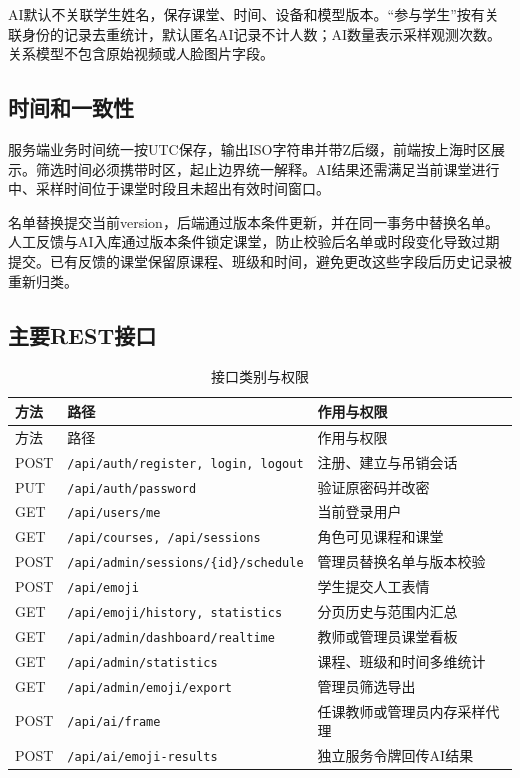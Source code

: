 \documentclass[UTF8,a4paper,zihao=-4,fontset=fandol]{ctexart}
\begin{document}
AI默认不关联学生姓名，保存课堂、时间、设备和模型版本。“参与学生”按有关联身份的记录去重统计，默认匿名AI记录不计人数；AI数量表示采样观测次数。关系模型不包含原始视频或人脸图片字段。

\subsection{时间和一致性}

服务端业务时间统一按UTC保存，输出ISO字符串并带Z后缀，前端按上海时区展示。筛选时间必须携带时区，起止边界统一解释。AI结果还需满足当前课堂进行中、采样时间位于课堂时段且未超出有效时间窗口。

名单替换提交当前version，后端通过版本条件更新，并在同一事务中替换名单。人工反馈与AI入库通过版本条件锁定课堂，防止校验后名单或时段变化导致过期提交。已有反馈的课堂保留原课程、班级和时间，避免更改这些字段后历史记录被重新归类。

\subsection{主要REST接口}

\begin{longtable}{p{1.2cm}p{8.1cm}p{4.85cm}}
\caption{接口类别与权限}\\
\toprule 方法 & 路径 & 作用与权限\\\midrule\endfirsthead
\toprule 方法 & 路径 & 作用与权限\\\midrule\endhead
POST & \texttt{/api/auth/register, login, logout} & 注册、建立与吊销会话\\
PUT & \texttt{/api/auth/password} & 验证原密码并改密\\
GET & \texttt{/api/users/me} & 当前登录用户\\
GET & \texttt{/api/courses, /api/sessions} & 角色可见课程和课堂\\
POST & \texttt{/api/admin/sessions/\{id\}/schedule} & 管理员替换名单与版本校验\\
POST & \texttt{/api/emoji} & 学生提交人工表情\\
GET & \texttt{/api/emoji/history, statistics} & 分页历史与范围内汇总\\
GET & \texttt{/api/admin/dashboard/realtime} & 教师或管理员课堂看板\\
GET & \texttt{/api/admin/statistics} & 课程、班级和时间多维统计\\
GET & \texttt{/api/admin/emoji/export} & 管理员筛选导出\\
POST & \texttt{/api/ai/frame} & 任课教师或管理员内存采样代理\\
POST & \texttt{/api/ai/emoji-results} & 独立服务令牌回传AI结果\\
\bottomrule\end{longtable}
\end{document}
